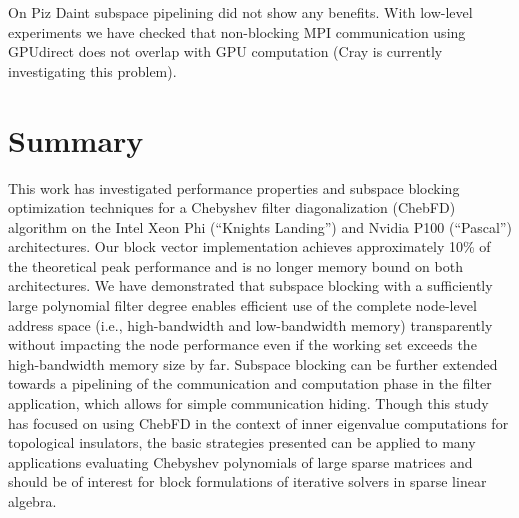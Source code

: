 \documentclass[letterpaper]{llncs}
\begin{document}
On Piz Daint subspace pipelining did not show any benefits. With
low-level experiments we have checked that non-blocking MPI
communication using GPUdirect does not overlap with GPU
computation (Cray is currently investigating this problem).

\section*{Summary}
This work has investigated performance properties and subspace blocking optimization techniques for a Chebyshev filter diagonalization (ChebFD) algorithm on the  Intel Xeon Phi (``Knights Landing'') and Nvidia P100 (``Pascal'') architectures. Our block vector implementation achieves approximately 10\% of the theoretical peak performance and is no longer memory bound on both architectures. We have demonstrated that subspace blocking with a sufficiently large polynomial filter degree enables efficient use of the complete node-level address space (i.e., high-bandwidth and low-bandwidth memory) transparently without impacting the node performance even if the working set exceeds the high-bandwidth memory size by far. Subspace blocking can be further extended towards a pipelining of the communication and computation phase in the filter application, which allows for simple communication hiding. Though this study has focused on using ChebFD in the context of inner eigenvalue computations for topological insulators, the basic strategies presented can be applied to many applications evaluating Chebyshev polynomials of large sparse matrices and should be of interest for block formulations of iterative solvers in sparse linear algebra.
\end{document}
